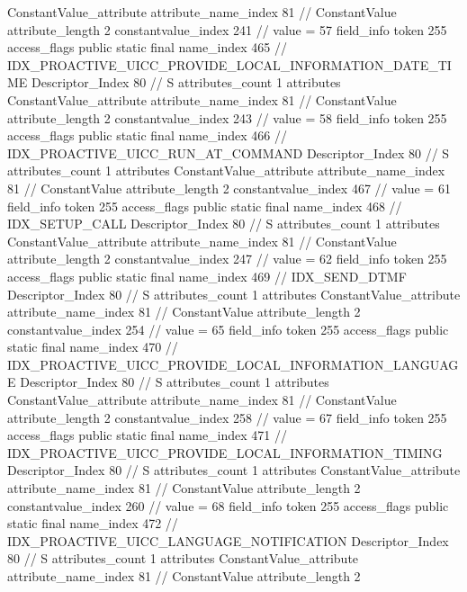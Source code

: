 {{{{{{				ConstantValue_attribute {
					attribute_name_index	81		// ConstantValue
					attribute_length	2
					constantvalue_index	241		// value = 57
				}
				}
			}
			field_info {
				token	255
				access_flags	public static final
				name_index	465		// IDX_PROACTIVE_UICC_PROVIDE_LOCAL_INFORMATION_DATE_TIME
				Descriptor_Index	80		// S
				attributes_count	1
				attributes {
				ConstantValue_attribute {
					attribute_name_index	81		// ConstantValue
					attribute_length	2
					constantvalue_index	243		// value = 58
				}
				}
			}
			field_info {
				token	255
				access_flags	public static final
				name_index	466		// IDX_PROACTIVE_UICC_RUN_AT_COMMAND
				Descriptor_Index	80		// S
				attributes_count	1
				attributes {
				ConstantValue_attribute {
					attribute_name_index	81		// ConstantValue
					attribute_length	2
					constantvalue_index	467		// value = 61
				}
				}
			}
			field_info {
				token	255
				access_flags	public static final
				name_index	468		// IDX_SETUP_CALL
				Descriptor_Index	80		// S
				attributes_count	1
				attributes {
				ConstantValue_attribute {
					attribute_name_index	81		// ConstantValue
					attribute_length	2
					constantvalue_index	247		// value = 62
				}
				}
			}
			field_info {
				token	255
				access_flags	public static final
				name_index	469		// IDX_SEND_DTMF
				Descriptor_Index	80		// S
				attributes_count	1
				attributes {
				ConstantValue_attribute {
					attribute_name_index	81		// ConstantValue
					attribute_length	2
					constantvalue_index	254		// value = 65
				}
				}
			}
			field_info {
				token	255
				access_flags	public static final
				name_index	470		// IDX_PROACTIVE_UICC_PROVIDE_LOCAL_INFORMATION_LANGUAGE
				Descriptor_Index	80		// S
				attributes_count	1
				attributes {
				ConstantValue_attribute {
					attribute_name_index	81		// ConstantValue
					attribute_length	2
					constantvalue_index	258		// value = 67
				}
				}
			}
			field_info {
				token	255
				access_flags	public static final
				name_index	471		// IDX_PROACTIVE_UICC_PROVIDE_LOCAL_INFORMATION_TIMING
				Descriptor_Index	80		// S
				attributes_count	1
				attributes {
				ConstantValue_attribute {
					attribute_name_index	81		// ConstantValue
					attribute_length	2
					constantvalue_index	260		// value = 68
				}
				}
			}
			field_info {
				token	255
				access_flags	public static final
				name_index	472		// IDX_PROACTIVE_UICC_LANGUAGE_NOTIFICATION
				Descriptor_Index	80		// S
				attributes_count	1
				attributes {
				ConstantValue_attribute {
					attribute_name_index	81		// ConstantValue
					attribute_length	2
}}}}}}}
